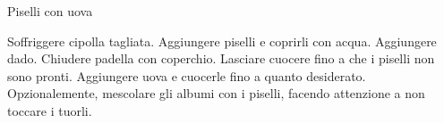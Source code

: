 \begin{recipe}{Piselli con uova}
    \begin{header}

    \end{header}

    \begin{ingredients}
    \end{ingredients}

    \begin{preparation}
        \step Soffriggere cipolla tagliata.
        \step Aggiungere piselli e coprirli con acqua. Aggiungere dado. Chiudere padella con coperchio.
         \step Lasciare cuocere fino a che i piselli non sono pronti.
        \step Aggiungere uova e cuocerle fino a quanto desiderato. Opzionalemente, mescolare gli albumi con i piselli, facendo attenzione a non toccare i tuorli.
    \end{preparation}
\end{recipe}
